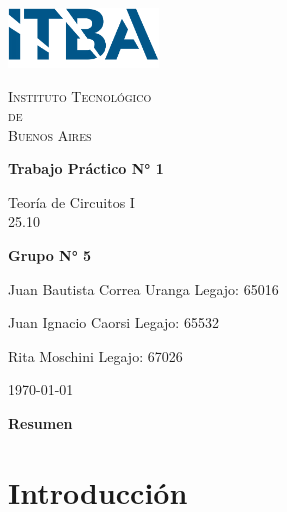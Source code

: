 \documentclass{article}
\newcommand{\Facultad}{Instituto Tecnológico \\de\\ Buenos Aires} %
\newcommand{\TPn}{Trabajo Práctico N° 1}
\begin{document}
    \begin{titlepage} %

        \begin{flushleft}
            \centering
            \includegraphics[width=0.3\textwidth]{Logo_ITBA.png}
        \end{flushleft}

        \centering
            
        {\scshape\LARGE \Facultad \par} %
        \vspace{1cm}                    %


        {\huge\bfseries \TPn \par}
        \vspace{1.5cm}
        {\Large Teoría de Circuitos I\\ 25.10 \par}
        \vfill                      %
        {\Large \bfseries Grupo N° 5 \par}
        \vspace{1cm}
        {\large Juan Bautista Correa Uranga \hfill Legajo: 65016 \par} %
        {\large Juan Ignacio Caorsi \hfill Legajo: 65532  \par}
        {\large Rita Moschini \hfill Legajo: 67026 \par} 
        \vfill
        {\large \today\par}
        \vfil

    \end{titlepage}


    {\centering \LARGE \bfseries Resumen \par}

    \newpage

    \tableofcontents %
    \newpage

    \section{Introducción}
\end{document}
